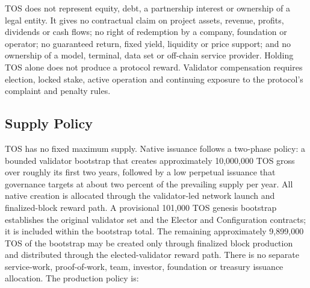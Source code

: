 \documentclass[11pt,oneside]{article}
\begin{document}
TOS does not represent equity, debt, a partnership interest or ownership of a legal entity.
It gives no contractual claim on project assets, revenue, profits, dividends or cash flows;
no right of redemption by a company, foundation or operator; no guaranteed return, fixed
yield, liquidity or price support; and no ownership of a model, terminal, data set or
off-chain service provider. Holding TOS alone does not produce a protocol reward. Validator
compensation requires election, locked stake, active operation and continuing exposure to
the protocol's complaint and penalty rules.

\subsection{Supply Policy}

TOS has no fixed maximum supply. Native issuance follows a two-phase policy: a bounded
validator bootstrap that creates approximately 10,000,000 TOS gross over roughly its first
two years, followed by a low perpetual issuance that governance targets at about two percent
of the prevailing supply per year. All native creation is allocated through the validator-led
network launch and finalized-block reward path. A provisional 101,000 TOS genesis bootstrap
establishes the original validator set and the Elector and Configuration contracts; it is
included within the bootstrap total. The remaining approximately 9,899,000 TOS of the
bootstrap may be created only through finalized block production and distributed through the
elected-validator reward path. There is no separate service-work, proof-of-work, team,
investor, foundation or treasury issuance allocation. The production policy is:
\end{document}
